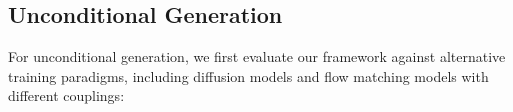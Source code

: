 \vspace{-4mm}
\subsection{Unconditional Generation}
\label{subsec:uncond_gen}
\vspace{-2mm}
%

%




For unconditional generation, we first evaluate our framework against alternative training paradigms, including diffusion models and flow matching models with different couplings:

